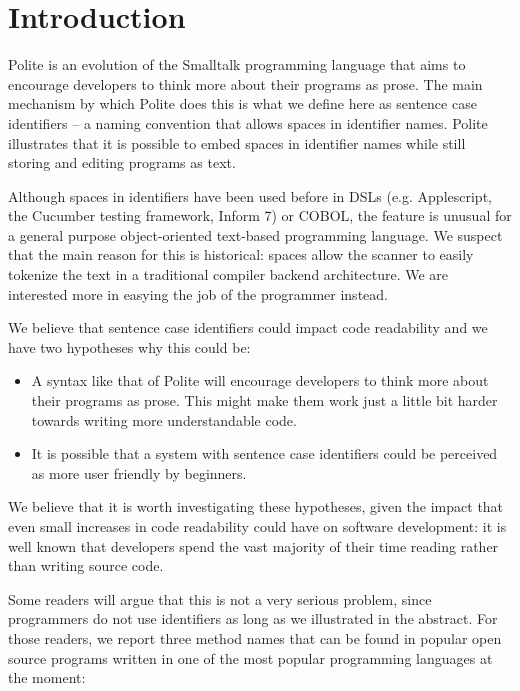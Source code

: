 

\section{Introduction}

Polite is an evolution of the Smalltalk programming language that aims to encourage developers to think more about their programs as prose. The main mechanism by which Polite does this is what we define here as sentence case identifiers -- a naming convention that allows spaces in identifier names. Polite illustrates that it is possible to embed spaces in identifier names while still storing and editing programs as text. 

Although spaces in identifiers have been used before in DSLs (e.g. Applescript, the Cucumber testing framework, Inform 7) or COBOL, the feature is unusual for a general purpose object-oriented text-based programming language. We suspect that the main reason for this is historical: spaces allow the scanner to easily tokenize the text in a traditional compiler backend architecture. We are interested more in easying the job of the programmer instead.


We believe that sentence case identifiers could impact code readability and we have two hypotheses why this could be: 

\begin{itemize}

	\item A syntax like that of Polite will encourage developers to think more about their programs as prose. This might make them work just a little bit harder towards writing more understandable code. 

	\item It is possible that a system with sentence case identifiers could be perceived as more user friendly by beginners.

\end{itemize}

We believe that it is worth investigating these hypotheses, given the impact that even small increases in code readability could have on software development: it is well known that developers spend the vast majority of their time reading rather than writing source code.


Some readers will argue that this is not a very serious problem, since programmers do not use identifiers as long as we illustrated in the abstract. For those readers, we report three method names that can be found in popular open source programs written in one of the most popular programming languages at the moment: 


